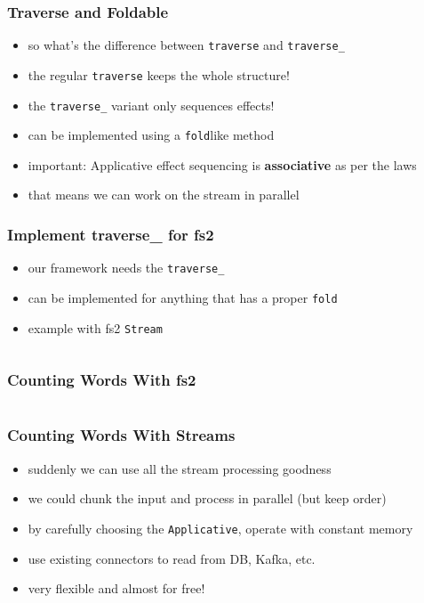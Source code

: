 \documentclass[aspectratio=169]{beamer}
\begin{document}
\begin{frame}
  \frametitle{Traverse and Foldable}
  \begin{itemize}
  \item so what's the difference between \texttt{traverse} and \texttt{traverse\_}
  \item the regular \texttt{traverse} keeps the whole structure!
  \item the \texttt{traverse\_} variant only sequences effects!
  \item can be implemented using a \texttt{fold}like method
  \item important: Applicative effect sequencing is \textbf{associative} as per the laws
  \item that means we can work on the stream in parallel
  \end{itemize}
\end{frame}

\begin{frame}[fragile]
  \frametitle{Implement traverse\_ for fs2}
  \begin{itemize}
  \item our framework needs the \texttt{traverse\_}
  \item can be implemented for anything that has a proper \texttt{fold}
  \item example with fs2 \texttt{Stream}
  \end{itemize}
  \vspace{5mm}
  \inputminted[fontsize=\small]{scala}{snippets/fs2-traverse-stream.scala}
\end{frame}

\begin{frame}[fragile]
  \frametitle{Counting Words With fs2}
  \inputminted[fontsize=\small]{scala}{snippets/fs2-count-words.scala}
\end{frame}

\begin{frame}
  \frametitle{Counting Words With Streams}
  \begin{itemize}
  \item suddenly we can use all the stream processing goodness
  \item we could chunk the input and process in parallel (but keep order)
  \item by carefully choosing the \texttt{Applicative}, operate with constant memory
  \item use existing connectors to read from DB, Kafka, etc.
  \item very flexible and almost for free!
  \end{itemize}
\end{frame}
\end{document}

